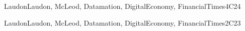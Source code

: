 \begin{syllabus}
\begin{unit}{\SPPrivacyandCivilLiberties}{}{LaudonLaudon, McLeod, Datamation, DigitalEconomy, FinancialTimes}{4}{C24}
	\begin{learningoutcomes}%
        \item \SPPrivacyandCivilLibertiesLODiscussTheFor [\Familiarity]
        \item \SPPrivacyandCivilLibertiesLOEvaluateSolutions [\Familiarity]
        \item \SPPrivacyandCivilLibertiesLODescribeTheDataThe [\Familiarity]
        \item \SPPrivacyandCivilLibertiesLODescribeTheDifferential [\Familiarity]
        \item \SPPrivacyandCivilLibertiesLOInvestigateTheTechnological [\Familiarity]
        \item \SPPrivacyandCivilLibertiesLOCritiqueThe [\Familiarity]
        \item \SPPrivacyandCivilLibertiesLOIdentifyStrategies [\Familiarity]
	\end{learningoutcomes}
\end{unit}

\begin{unit}{\SPSecurityPoliciesLawsandComputerCrimes}{}{LaudonLaudon, McLeod, Datamation, DigitalEconomy, FinancialTimes}{2}{C23}
	\begin{topics}
        \item \SPSecurityPoliciesLawsandComputerCrimesTopicExamples
        \item \SPSecurityPoliciesLawsandComputerCrimesTopicSocial
        \item \SPSecurityPoliciesLawsandComputerCrimesTopicIssues
        \item \SPSecurityPoliciesLawsandComputerCrimesTopicMotivations
        \item \SPSecurityPoliciesLawsandComputerCrimesTopicEffects
        \item \SPSecurityPoliciesLawsandComputerCrimesTopicCrime
        \item \SPSecurityPoliciesLawsandComputerCrimesTopicSecurity
	\end{topics}


\end{unit}
\end{syllabus}
